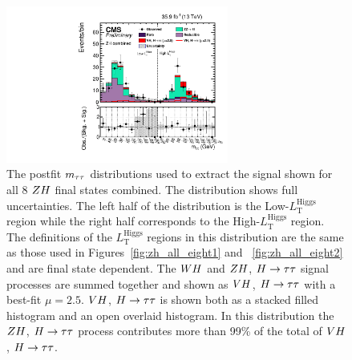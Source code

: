 

\begin{figure}[h!]
 \begin{center}
  \includegraphics[width=0.65\textwidth]{higgs_to_taus_vh/plots/zh/zh_postfit.pdf}
 \end{center}
 \caption{The postfit $m_{\tau\tau}$ distributions used to extract the signal shown
  for all 8 $ZH$ final states combined.
  The distribution shows full uncertainties.
  The left half of the distribution is the Low-$L_{\text{T}}^{\textrm{Higgs}}$ region
  while the right half corresponds to the High-$L_{\text{T}}^{\textrm{Higgs}}$ region.
  The definitions of the $L_{\text{T}}^{\textrm{Higgs}}$ regions in this distribution 
  are the same as those used in Figures~\ref{fig:zh_all_eight1} 
  and ~\ref{fig:zh_all_eight2} and are final state dependent.
  The $WH$ and $ZH$, $H\to\tau\tau$ signal processes are summed together and 
  shown as $VH$, $H\to\tau\tau$ with a best-fit $\mu = 2.5$. $VH$, $H\to\tau\tau$ is shown both as 
  a stacked filled histogram and an open overlaid histogram. In this distribution 
  the $ZH$, $H\to\tau\tau$ process contributes more than 99\% of the total of $VH$, $H\to\tau\tau$.
 }
 \label{fig:zh_results_svFitAll}
\end{figure}



